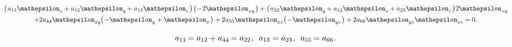 \vspace{-0.25em}\noindent
\begin{gather*}
\bigl( \hspace{.2ex}
a_{11} \mathepsilon_{x} \hspace{-.2ex}
+ a_{12} \mathepsilon_{y} \hspace{-.2ex}
+ a_{13} \mathepsilon_{z} \hspace{.2ex} \bigr) \hspace{.2ex}
\bigl( \hspace{.2ex}
- 2 \mathepsilon_{xy}
\hspace{.2ex} \bigr)
+ \bigl( \hspace{.2ex}
a_{22} \mathepsilon_{y} \hspace{-.2ex}
+ a_{12} \mathepsilon_{x} \hspace{-.2ex}
+ a_{23} \mathepsilon_{z}
\hspace{.2ex} \bigr)
2 \mathepsilon_{xy} \hspace{-.2ex}
\\
%
+ 2 a_{44} \mathepsilon_{xy} \hspace{-.2ex}
\bigl( \hspace{.2ex} - \mathepsilon_y + \mathepsilon_x \hspace{.2ex} \bigr)
+ 2 a_{55} \mathepsilon_{xz}
\bigl( \hspace{.2ex} - \mathepsilon_{yz} \hspace{.2ex} \bigr)
+ 2 a_{66} \mathepsilon_{yz} \mathepsilon_{xz} \hspace{-.2ex}
= 0
.
\end{gather*}

\noindent
{}

\vspace{-0.25em}\noindent
\begin{equation*}
a_{11} \hspace{-.2ex} = a_{12} + a_{44} \hspace{-.2ex} = a_{22}
\hspace{.1ex} ,
\hspace{.5em}
a_{13} = a_{23}
\hspace{.1ex} ,
\hspace{.5em}
a_{55} \hspace{-.2ex} = a_{66}
\hspace{.1ex} .
\end{equation*}


